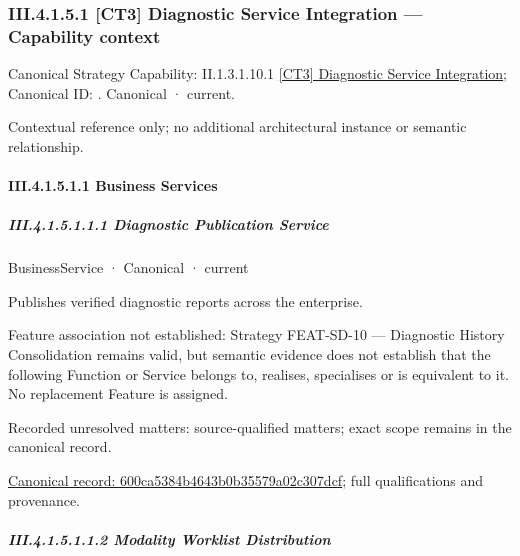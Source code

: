 \subsubsection*{III.4.1.5.1 [CT3] Diagnostic Service Integration — Capability context}
\label{navigation:III.4.1.5.1}

{\small Canonical Strategy Capability: II.1.3.1.10.1 \hyperref[element:9ded2f3a28d24017bb921a0cdcf65a2b]{[CT3] Diagnostic Service Integration}; Canonical ID: \texttt{}. Canonical · current.}\par
Contextual reference only; no additional architectural instance or semantic relationship.\par
\paragraph*{III.4.1.5.1.1 Business Services}
\label{navigation:III.4.1.5.1.1}

\subparagraph*{III.4.1.5.1.1.1 Diagnostic Publication Service}
\label{navigation:III.4.1.5.1.1.1}

\label{element:600ca5384b4643b0b35579a02c307dcf}
{\small BusinessService · Canonical · current}\par

Publishes verified diagnostic reports across the enterprise.



Feature association not established: Strategy FEAT-SD-10 — Diagnostic History Consolidation remains valid, but semantic evidence does not establish that the following Function or Service belongs to, realises, specialises or is equivalent to it. No replacement Feature is assigned.


{\small Recorded unresolved matters: source-qualified matters; exact scope remains in the canonical record.}\par
{\footnotesize \href{../../../../../../../continuum/business/business-service/600ca5384b4643b0b35579a02c307dcf.md}{Canonical record: 600ca5384b4643b0b35579a02c307dcf}; full qualifications and provenance.}\par
\subparagraph*{III.4.1.5.1.1.2 Modality Worklist Distribution}
\label{navigation:III.4.1.5.1.1.2}


